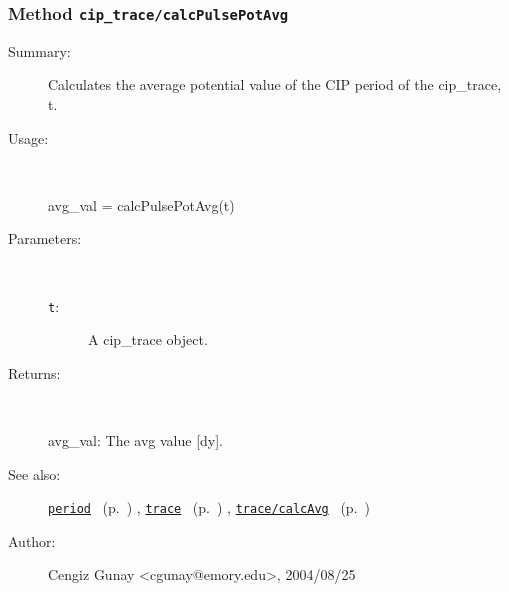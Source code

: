 \subsubsection[Method \texttt{calcPulsePotAvg}]{Method \texttt{cip\_trace/calcPulsePotAvg}}%
%
\label{ref_cip_trace__calcPulsePotAvg}%
\hypertarget{ref_cip_trace__calcPulsePotAvg}{}%
\begin{description}
\item[Summary:]Calculates the average potential value of the 
		CIP period of the cip\_trace, t. 
%
\item[Usage:]~%
\begin{lyxcode}%
avg\_val = calcPulsePotAvg(t)
%
\end{lyxcode}%
%
%
\item[Parameters:]~
\begin{description}%
\item[\texttt{t}:]
 A cip\_trace object.
\end{description}%
%
\item[Returns:
]~

	avg\_val: The avg value [dy].
%
%
\item[See also:]%
\hyperlink{ref_period}{\texttt{period}}%
\ (p.~\pageref{ref_period})%
%
, \hyperlink{ref_trace}{\texttt{trace}}%
\ (p.~\pageref{ref_trace})%
%
, \hyperlink{ref_trace__calcAvg}{\texttt{trace/calcAvg}}%
\ (p.~\pageref{ref_trace__calcAvg})%
%
%
\item[Author:]%
Cengiz Gunay <cgunay@emory.edu>, 2004/08/25
%
\end{description}
\methodline%

